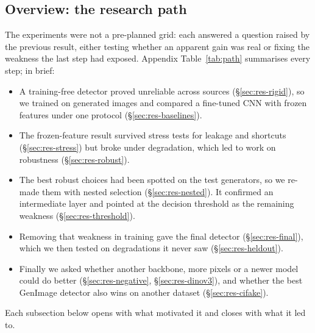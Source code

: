 \documentclass[10pt,a4paper]{article}
\begin{document}
\subsection{Overview: the research path}\label{sec:path}
The experiments were not a pre-planned grid: each answered a question raised by the previous result, either testing whether an apparent gain was real or fixing the weakness the last step had exposed. Appendix Table~\ref{tab:path} summarises every step; in brief:
\begin{itemize}
  \item A training-free detector proved unreliable across sources (\S\ref{sec:res-rigid}), so we trained on generated images and compared a fine-tuned CNN with frozen features under one protocol (\S\ref{sec:res-baselines}).
  \item The frozen-feature result survived stress tests for leakage and shortcuts (\S\ref{sec:res-stress}) but broke under degradation, which led to work on robustness (\S\ref{sec:res-robust}).
  \item The best robust choices had been spotted on the test generators, so we re-made them with nested selection (\S\ref{sec:res-nested}). It confirmed an intermediate layer and pointed at the decision threshold as the remaining weakness (\S\ref{sec:res-threshold}).
  \item Removing that weakness in training gave the final detector (\S\ref{sec:res-final}), which we then tested on degradations it never saw (\S\ref{sec:res-heldout}).
  \item Finally we asked whether another backbone, more pixels or a newer model could do better (\S\ref{sec:res-negative}, \S\ref{sec:res-dinov3}), and whether the best GenImage detector also wins on another dataset (\S\ref{sec:res-cifake}).
\end{itemize}
Each subsection below opens with what motivated it and closes with what it led to.
\end{document}
